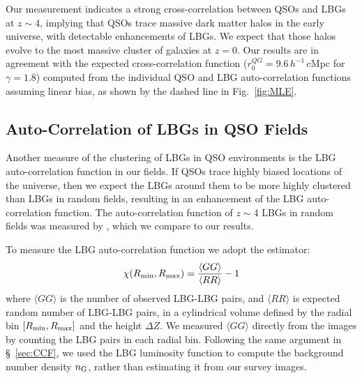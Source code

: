\documentclass[iop, revtex4]{emulateapj}
\begin{document}
Our measurement indicates a strong cross-correlation between QSOs and
LBGs at $z\sim4$, implying that QSOs
trace massive dark matter halos in the early universe, with detectable
enhancements of LBGs.  We expect that those halos evolve to the most 
massive cluster of galaxies at $z=0$.
Our results are in agreement with the expected cross-correlation
function ($r^{QG}_{0}=9.6\,h^{-1}$\,cMpc for $\gamma=1.8$) computed from the individual QSO
and LBG auto-correlation functions assuming linear bias, as shown by the
dashed line in Fig.~\ref{fig:MLE}. 

\subsection{Auto-Correlation of LBGs in QSO Fields}
\label{sec:ACF}

Another measure of the clustering of LBGs in QSO environments is the
LBG auto-correlation function in our fields. If QSOs trace highly
biased locations of the universe, then we expect the LBGs around them to be more
highly clustered than LBGs in random fields, resulting in an enhancement of the LBG auto-correlation function. 
The auto-correlation function of $z\sim4$ LBGs in random
fields was measured by \citet{Ouchi04b}, which we compare to our
results.

To measure the LBG auto-correlation function we adopt the estimator:
\begin{equation}
\chi(R_{\rm min}, R_{\rm max}) = \frac{\langle GG\rangle}{\langle RR\rangle} -1
\label{eq:estimator_auto}
\end{equation}
where $\langle GG\rangle$ is the number of observed LBG-LBG pairs, and
$\langle RR\rangle$ is expected random number of LBG-LBG pairs,
in a cylindrical volume defined
by the radial bin $[R_{\rm min}, R_{\rm max}]$ and the height $\Delta
Z$. We measured $\langle GG\rangle$ directly from the images by
counting the LBG pairs in each radial bin. Following the same argument in
\S~\ref{sec:CCF}, we used the LBG luminosity function to compute the background
number density $n_{\rm G}$, rather than estimating it from our survey images. 
\end{document}
